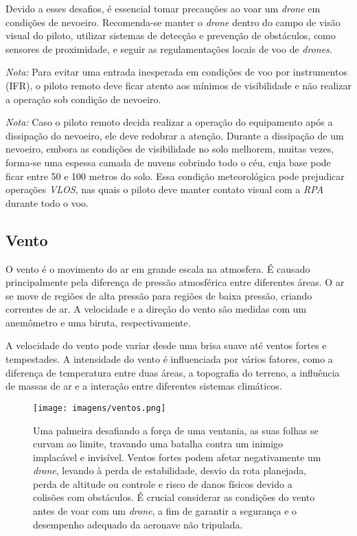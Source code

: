 \documentclass[a4paper, 12pt, onecolumn,singlespacing]{article}
\begin{document}
	Devido a esses desafios, é essencial tomar precauções ao voar um \textit{drone} em condições de nevoeiro. Recomenda-se manter o \textit{drone} dentro do campo de visão visual do piloto, utilizar sistemas de detecção e prevenção de obstáculos, como sensores de proximidade, e seguir as regulamentações locais de voo de \textit{drones}.
	
	\emph{Nota:} Para evitar uma entrada inesperada em condições de voo por instrumentos (IFR), o piloto remoto deve ficar atento aos mínimos de visibilidade e não realizar a operação sob condição de nevoeiro.
		
	\emph{Nota: } Caso o piloto remoto decida realizar a operação do equipamento após a dissipação do nevoeiro, ele deve redobrar a atenção. Durante a dissipação de um nevoeiro, embora as condições de visibilidade no solo melhorem, muitas vezes, forma-se uma espessa camada de nuvens cobrindo todo o céu, cuja base pode ficar entre 50 e 100 metros do solo. Essa condição meteorológica pode prejudicar operações \textit{VLOS}, nas quais o piloto deve manter contato visual com a \textit{RPA} durante todo o voo. 
	
	\subsection{Vento}
	
	O vento é o movimento do ar em grande escala na atmosfera. É causado principalmente pela diferença de pressão atmosférica entre diferentes áreas. O ar se move de regiões de alta pressão para regiões de baixa pressão, criando correntes de ar. A velocidade e a direção do vento são medidas com um anemômetro e uma biruta, respectivamente.
	
	A velocidade do vento pode variar desde uma brisa suave até ventos fortes e tempestades. A intensidade do vento é influenciada por vários fatores, como a diferença de temperatura entre duas áreas, a topografia do terreno, a influência de massas de ar e a interação entre diferentes sistemas climáticos.
	
	
	\begin{figure}[h]
		\centering
		\texttt{[image: imagens/ventos.png]}
		\caption{Uma palmeira desafiando a força de uma ventania, as suas folhas se curvam ao limite, travando uma batalha contra um inimigo implacável e invisível. Ventos fortes podem afetar negativamente um \textit{drone}, levando à perda de estabilidade, desvio da rota planejada, perda de altitude ou controle e risco de danos físicos devido a colisões com obstáculos. É crucial considerar as condições do vento antes de voar com um \textit{drone}, a fim de garantir a segurança e o desempenho adequado da aeronave não tripulada.}
		\label{fig:ventos}
	\end{figure}
	
\end{document}
